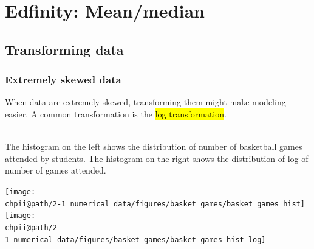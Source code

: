 \documentclass[slidestop,compress,mathserif]{beamer}
\makeatletter
\def\chpii@path{../../Chp 2}
\makeatother
\begin{document}


\section{Edfinity: Mean/median}


\subsection{Transforming data}


\begin{frame}
\frametitle{Extremely skewed data}

When data are extremely skewed, transforming them might make modeling easier. A common transformation is the \hl{log transformation}.

$\:$ \\
\pause
The histogram on the left shows the distribution of number of basketball games attended by students. The histogram on the right shows the distribution of log of number of games attended.

\begin{center}
\texttt{[image: \\chpii@path/2-1\_numerical\_data/figures/basket\_games/basket\_games\_hist]}
\texttt{[image: \\chpii@path/2-1\_numerical\_data/figures/basket\_games/basket\_games\_hist\_log]}
\end{center}

\end{frame}

\end{document}
